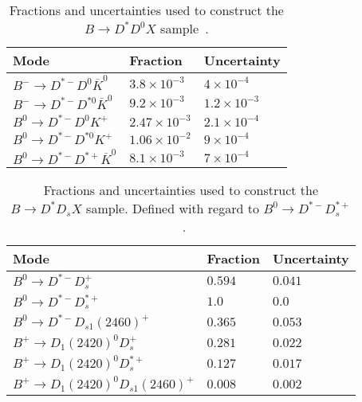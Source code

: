     
{
\renewcommand{\arraystretch}{1.25}
 \begin{table}
\centering
\scriptsize
\begin{tabular}{l | l | l }
Mode & Fraction & Uncertainty \\
\hline
$B^{-} \rightarrow D^{*-} D^{0} \overline{K}^{0}$ & $3.8\times10^{-3}$  & $4\times 10^{-4}$\\\hline
$B^{-} \rightarrow D^{*-} D^{* 0} \overline{K}^{0}$ & $9.2\times10^{-3}$  & $1.2\times 10^{-3}$\\\hline
$B^{0} \rightarrow D^{*-} D^{0} K^{+}$ & $2.47\times10^{-3}$  & $2.1\times 10^{-4}$\\\hline
$B^{0} \rightarrow D^{*-} D^{* 0} K^{+}$ & $1.06\times10^{-2}$  & $9\times 10^{-4}$\\\hline
$B^{0} \rightarrow D^{*-} D^{*+} \overline{K}^{0}$  & $8.1 \times 10^{-3}$ &$7 \times 10^{-4}$\\

\end{tabular}
\caption{Fractions and uncertainties used to construct the $B \rightarrow D^{*} D^{0} X$ sample~\cite{PhysRevD.98.030001}.}
\label{tab:Ds_bkg_modes}
\end{table}
    }
    

  

{\renewcommand{\arraystretch}{1.25}
 \begin{table}
\centering
\scriptsize
\begin{tabular}{l | l | l }
Mode & Fraction & Uncertainty \\
\hline
$B^{0} \rightarrow D^{*-} D_{s}^{+}$ & $0.594$  & $0.041$\\\hline
$B^{0} \rightarrow D^{*-} D_{s}^{*+}$ & $1.0$  & $0.0$\\\hline
$B^{0} \rightarrow D^{*-} D_{s 1}(2460)^{+}$ & $0.365$  & $0.053$\\\hline
$B^{+} \rightarrow D_{1}(2420)^{0} D_{s}^{+}$ & $0.281$  & $0.022$\\\hline
$B^{+} \rightarrow D_{1}(2420)^{0} D_{s}^{*+}$ & $0.127$  & $0.017$\\\hline

$B^{+} \rightarrow D_{1}(2420)^{0} D_{s 1}(2460)^{+}$  & $0.008$ &$0.002$\\

\end{tabular}
\caption{Fractions and uncertainties used to construct the $B \rightarrow D^{*} D_{s} X$ sample. Defined with regard to $B^{0} \rightarrow D^{*-} D_{s}^{*+}$~\cite{PhysRevD.97.072013}.}
\label{tab:Ds_bkg_modes}
\end{table}
    }
    
